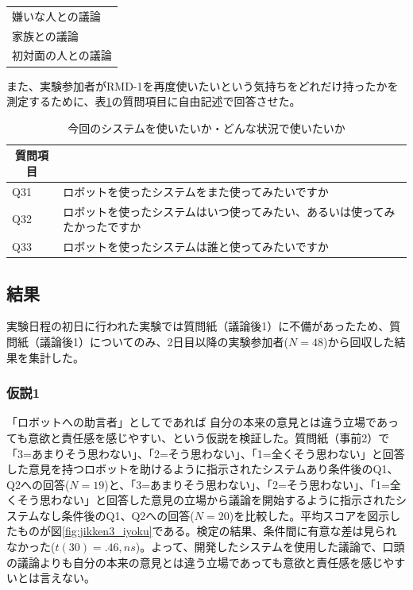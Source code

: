 \documentclass[11pt, a4paper]{jreport} %
\begin{document}
\begin{table}[]
\begin{tabular}{@{}l@{}}
	\hspace{0.5cm}嫌いな人との議論                                                                                 \\
	\hspace{0.5cm}家族との議論                                                                                   \\
	\hspace{0.5cm}初対面の人との議論                                                                                \\ \bottomrule
\end{tabular}
\end{table}




また、実験参加者がRMD-1を再度使いたいという気持ちをどれだけ持ったかを測定するために、表\ref{tab:intention}の質問項目に自由記述で回答させた。
\begin{table}[H]
\caption{今回のシステムを使いたいか・どんな状況で使いたいか}
\centering
\label{tab:intention}
\begin{tabular}{@{}ll@{}}
\toprule
\multicolumn{1}{c}{質問項目}              \\ \midrule
Q31&ロボットを使ったシステムをまた使ってみたいですか\\
Q32&ロボットを使ったシステムはいつ使ってみたい、あるいは使ってみたかったですか\\
Q33&ロボットを使ったシステムは誰と使ってみたいですか \\ \bottomrule
\end{tabular}
\end{table}

\subsection{結果}
実験日程の初日に行われた実験では質問紙（議論後1）に不備があったため、質問紙（議論後1）についてのみ、2日目以降の実験参加者($N=48$)から回収した結果を集計した。

\subsubsection*{仮説1}
「ロボットへの助言者」としてであれば
自分の本来の意見とは違う立場であっても意欲と責任感を感じやすい、という仮説を検証した。質問紙（事前2）で「3=あまりそう思わない」、「2=そう思わない」、「1=全くそう思わない」と回答した意見を持つロボットを助けるように指示されたシステムあり条件後のQ1、Q2への回答($N=19$)と、「3=あまりそう思わない」、「2=そう思わない」、「1=全くそう思わない」と回答した意見の立場から議論を開始するように指示されたシステムなし条件後のQ1、Q2への回答($N=20$)を比較した。平均スコアを図示したものが図\ref{fig:jikken3_iyoku}である。検定の結果、条件間に有意な差は見られなかった($t(30)= .46, ns$)。よって、開発したシステムを使用した議論で、口頭の議論よりも自分の本来の意見とは違う立場であっても意欲と責任感を感じやすいとは言えない。
\end{document}
